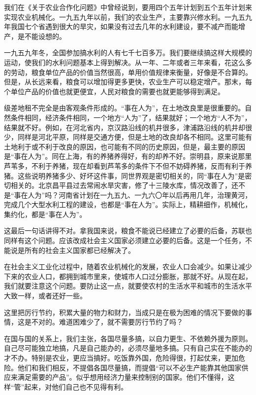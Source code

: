 我们在《关于农业合作化问题》中曾经说到，要用四个五年计划到五个五年计划来实现农业机械化。一九五九年以前，我们的农业生产，主要靠兴修水利。一九五九年我国七个省遇到很大的旱灾，如果没有过去几年的水利建设，要不减产而能增产，是不能设想的。

一九五九年冬，全国参加搞水利的人有七千七百多万。我们要继续搞这样大规模的运动，使我们的水利问题基本上得到解决。从一年、二年或者三年来看，花这么多的劳动，粮食单位产品的价值当然很高，单用价值规律来衡量，好像是不合算的。但是，从长远来看，粮食可以增加得更多更快，农业生产可以稳定增产。那末，每个单位产品的价值也就更便宜，人民对粮食的需要也就更能够得到满足。

级差地租不完全是由客观条件形成的。“事在人为”，在土地改良里是很重要的。自然条件相同，经济条件相同，一个地方“人为”了，结果就好；一个地方“人不为”，结果就不好。例如，在河北省内，京汉路沿线的机井很多，津浦路沿线的机井却很少，同样是河北平原，同样是交通方便，但是土地的改良却各不相同。这里可能有土地利于或不利于改良的原因，也可能有不同的历史原因，但是，最主要的原因是“事在人为”。同在上海，有的养猪养得好，有的却养不好。崇明县，原来说那里芦苇多，不利于养猪，现在却看到芦苇多的条件下不但不妨碍养猪，反而有利于养猪。这些说明养猪多少、好坏这件事，同世界观是密切相关的，同“事在人为”是密切相关的。北京昌平县过去常闹水旱灾害，修了十三陵水库，情况改善了，还不是“事在人为”吗？河南省计划在一九五九、一九六〇年以后再用几年，治理黄河，完成几个大型水利工程的建设，也都是“事在人为”。实际上，精耕细作，机械化，集约化，都是“事在人为”。

这最后一句话讲得不对。拿我国来说，粮食不能说已经建立了必要的后备，苏联也同样有这个问题。应该改成社会主义国家必须建立必要的后备。这是一个任务，不能说是所有的社会主义国家都已经解决了。

在社会主义工业化过程中，随着农业机械化的发展，农业人口会减少。如果让减少下来的农业人口，都拥到城市里来，使城市人口过分膨胀，那就不好。从现在起，我们就要注意这个问题。要防止这一点，就要使农村的生活水平和城市的生活水平大致一样，或者还好一些。

这里把厉行节约，积累大量的物力和财力，当成只是在极为困难的情况下要做的事情，这是不对的。难道困难少了，就不需要厉行节约了吗？

在国与国的关系上，我们主张，各国尽量多搞，以自力更生、不依赖外援为原则。自己尽可能独立地搞，凡是自己能办的，必须尽量地多搞。只有自己实在不能办的才不办。特别是农业，更应当搞好。吃饭靠外国，危险得很，打起仗来，更加危险。他们和我们相反，不提倡各国尽量搞，而提倡“可以不必生产能靠其他国家供应来满足需要的产品”。似乎想用经济力量来控制别的国家。他们不懂得，这样“管”起来，对他们自己也不见得有利。

